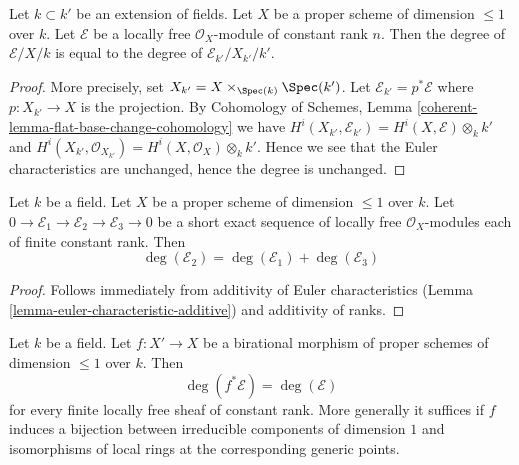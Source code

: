 \begin{lemma}
\label{lemma-degree-base-change}
Let $k \subset k'$ be an extension of fields. Let $X$ be a proper scheme of
dimension $\leq 1$ over $k$. Let $\mathcal{E}$ be a locally free
$\mathcal{O}_X$-module of constant rank $n$. Then the degree of
$\mathcal{E}/X/k$ is equal to the degree of
$\mathcal{E}_{k'}/X_{k'}/k'$.
\end{lemma}

\begin{proof}
More precisely, set $X_{k'} = X \times_{\Spec(k)} \Spec(k')$.
Let $\mathcal{E}_{k'} = p^*\mathcal{E}$ where $p : X_{k'} \to X$
is the projection. By
Cohomology of Schemes, Lemma \ref{coherent-lemma-flat-base-change-cohomology}
we have
$H^i(X_{k'}, \mathcal{E}_{k'}) = H^i(X, \mathcal{E}) \otimes_k k'$
and
$H^i(X_{k'}, \mathcal{O}_{X_{k'}}) = H^i(X, \mathcal{O}_X) \otimes_k k'$.
Hence we see that the Euler characteristics are unchanged, hence the
degree is unchanged.
\end{proof}

\begin{lemma}
\label{lemma-degree-additive}
Let $k$ be a field. Let $X$ be a proper scheme of dimension $\leq 1$
over $k$. Let $0 \to \mathcal{E}_1 \to \mathcal{E}_2 \to \mathcal{E}_3 \to 0$
be a short exact sequence of locally free $\mathcal{O}_X$-modules
each of finite constant rank. Then
$$
\deg(\mathcal{E}_2) = \deg(\mathcal{E}_1) + \deg(\mathcal{E}_3)
$$
\end{lemma}

\begin{proof}
Follows immediately from additivity of Euler characteristics
(Lemma \ref{lemma-euler-characteristic-additive})
and additivity of ranks.
\end{proof}

\begin{lemma}
\label{lemma-degree-birational-pullback}
Let $k$ be a field. Let $f : X' \to X$ be a birational morphism of
proper schemes of dimension $\leq 1$ over $k$. Then
$$
\deg(f^*\mathcal{E}) = \deg(\mathcal{E})
$$
for every finite locally free sheaf of constant rank. More generally
it suffices if $f$ induces a bijection between irreducible components
of dimension $1$ and isomorphisms of local rings at the corresponding
generic points.
\end{lemma}

